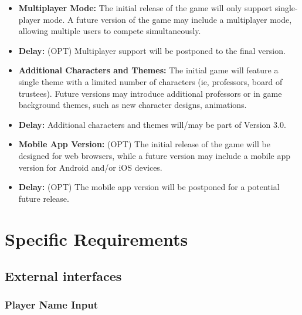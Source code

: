 \documentclass{article}
\begin{document}
\begin{itemize}
    \item \textbf{Multiplayer Mode:} The initial release of the game will only support single-player mode. A future version of the game may include a multiplayer mode, allowing multiple users to compete simultaneously.
    \item \textbf{Delay:} (OPT) Multiplayer support will be postponed to the final version.

    \item \textbf{Additional Characters and Themes:} The initial game will feature a single theme with a limited number of characters (ie, professors, board of trustees). Future versions may introduce additional professors or in game background themes, such as new character designs, animations.
    \item \textbf{Delay:} Additional characters and themes will/may be part of Version 3.0.

    \item \textbf{Mobile App Version:} (OPT) The initial release of the game will be designed for web browsers, while a future version may include a mobile app version for Android and/or iOS devices.
    \item \textbf{Delay:} (OPT) The mobile app version will be postponed for a potential future release.
\end{itemize}

\section{Specific Requirements}

\subsection{External interfaces}

\subsubsection{Player Name Input}
\end{document}
